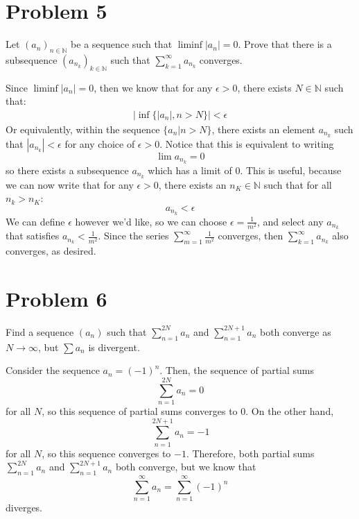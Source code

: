 \documentclass[10pt]{article}
\begin{document}
		\section*{Problem 5}
		Let $(a_n)_{n \in \mathbb N}$ be a sequence such that $\liminf |a_n| = 0$. Prove that there is a 
		subsequence $(a_{n_k})_{k \in \mathbb N}$ such that $\sum_{k = 1}^\infty a_{n_k}$ converges.

		\begin{solution}
			Since $\liminf |a_n| = 0$, then we know that for any $\epsilon > 0$, there exists $N \in \mathbb N$
			such that:
			\begin{align*}
				|\inf \{| a_n|,  n > N\}| < \epsilon
			\end{align*}
			Or equivalently, within the sequence $\{ a_n | n > N\}$, there exists an element $a_{n_k}$ such that
			$|a_{n_k}| < \epsilon$ for any choice of $\epsilon > 0$. Notice that this is equivalent to writing
			\[
				\lim a_{n_k} = 0
			\]
			so there exists a subsequence $a_{n_k}$ which has a limit of 0. This is useful, because we can now
			write that for any $\epsilon > 0$, there exists an $n_K \in \mathbb N$ such that for all $n_k > n_K$:
			\[
				a_{n_k} < \epsilon
			\]
			We can define $\epsilon$ however we'd like, so we can choose $\epsilon = \frac{1}{m^2}$, and select
			any $a_{n_k}$ that satisfies $a_{n_k} < \frac{1}{m^2}$. Since the series
			$\sum_{m = 1}^\infty \frac{1}{m^2}$ converges, then $\sum_{k = 1}^\infty  a_{n_k}$ also converges,
			as desired. 
		\end{solution}

		\pagebreak
		\section*{Problem 6}
		Find a sequence $(a_n)$ such that $\sum_{n = 1}^{2N} a_n$ and $\sum_{n = 1}^{2N + 1} a_n$ both converge
		as $N \to \infty$, but $\sum a_n$ is divergent.

		\begin{solution}
			Consider the sequence $a_n = (-1)^n$. Then, the sequence of partial sums
			\[
				\sum_{n = 1}^{2N} a_n = 0
			\]
			for all $N$, so this sequence of partial sums converges to 0. On the other hand,
			\[
				\sum_{n = 1}^{2N+1} a_n = -1 
			\] 
			for all $N$, so this sequence converges to $-1$. Therefore, both partial sums $\sum_{n = 1}
			^{2N} a_n$ and $\sum_{n =1}^{2N+1} a_n$ both converge, but we know that 
			\[
				\sum_{n = 1}^\infty a_n = \sum_{n=1}^\infty (-1)^n
			\] 
			diverges. 
		\end{solution}

		
\end{document}
